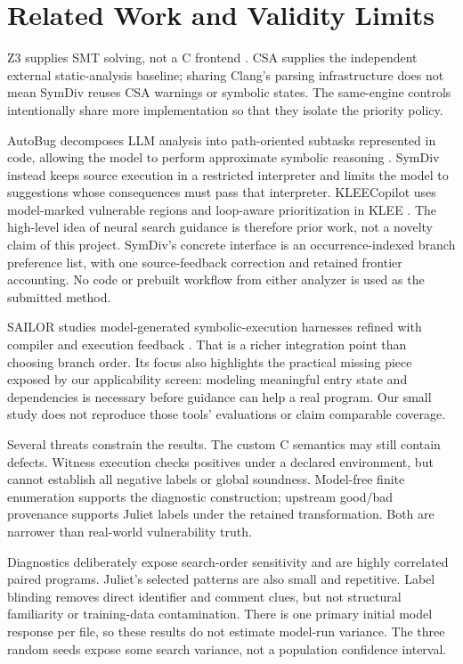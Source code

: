 \documentclass[sigconf]{acmart}
\begin{document}
\section{Related Work and Validity Limits}
Z3 supplies SMT solving, not a C frontend \cite{z3}. CSA supplies the
independent external static-analysis baseline; sharing Clang's parsing
infrastructure does not mean SymDiv reuses CSA warnings or symbolic states.
The same-engine controls intentionally share more implementation so that
they isolate the priority policy.

AutoBug decomposes LLM analysis into path-oriented subtasks represented in
code, allowing the model to perform approximate symbolic reasoning
\cite{autobug}. SymDiv instead keeps source execution in a restricted
interpreter and limits the model to suggestions whose consequences must
pass that interpreter. KLEECopilot uses model-marked vulnerable regions
and loop-aware prioritization in KLEE \cite{kleecopilot}. The high-level
idea of neural search guidance is therefore prior work, not a novelty claim
of this project. SymDiv's concrete interface is an occurrence-indexed
branch preference list, with one source-feedback correction and retained
frontier accounting. No code or prebuilt workflow from either analyzer
is used as the submitted method.

SAILOR studies model-generated symbolic-execution harnesses refined with
compiler and execution feedback \cite{sailor}. That is a richer integration
point than choosing branch order. Its focus also highlights the practical
missing piece exposed by our applicability screen: modeling meaningful
entry state and dependencies is necessary before guidance can help a real
program. Our small study does not reproduce those tools' evaluations or
claim comparable coverage.

Several threats constrain the results. The custom C semantics may still
contain defects. Witness execution checks positives under a declared
environment, but cannot establish all negative labels or global soundness.
Model-free finite enumeration supports the diagnostic construction;
upstream good/bad provenance supports Juliet labels under the retained
transformation. Both are narrower than real-world vulnerability truth.

Diagnostics deliberately expose search-order sensitivity and are highly
correlated paired programs. Juliet's selected patterns are also small and
repetitive. Label blinding removes direct identifier and comment clues,
but not structural familiarity or training-data contamination. There is
one primary initial model response per file, so these results do not
estimate model-run variance. The three random seeds expose some search
variance, not a population confidence interval.
\end{document}
